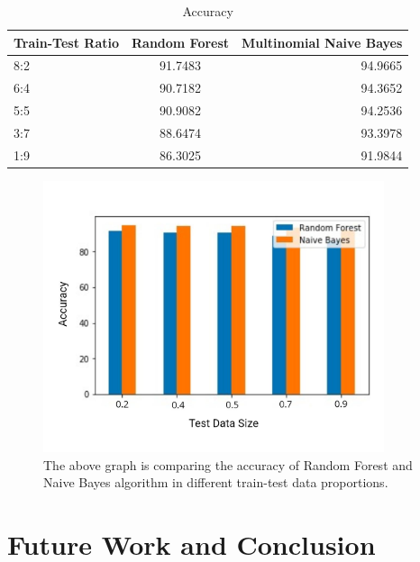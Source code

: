 \documentclass[runningheads]{llncs}
\begin{document}
\begin{table}[h!]
  \begin{center}
    \caption{Accuracy}
    \label{tab:table1}
    \begin{tabular}{l|c|r} %
      \hline
      
      
      \textbf{Train-Test Ratio} & \textbf{Random Forest} & 
      
      \textbf{Multinomial Naive Bayes}\\
      
      \hline
      8:2 & 91.7483 & 94.9665\\
      \hline
      6:4 & 90.7182 & 94.3652\\
      \hline
      5:5 & 90.9082 & 94.2536\\
      \hline
      3:7 & 88.6474 & 93.3978\\
      \hline
      1:9 & 86.3025 & 91.9844\\
      \hline
      
    \end{tabular}
  \end{center}
\end{table}

\begin{figure}
\centering
\includegraphics[width=10cm]{result.jpeg}
\caption{The above graph is comparing the accuracy of Random Forest and Naive Bayes algorithm in different train-test data proportions. } \label{fig9}
\end{figure}
\newline

\section{Future Work and Conclusion}
\end{document}
